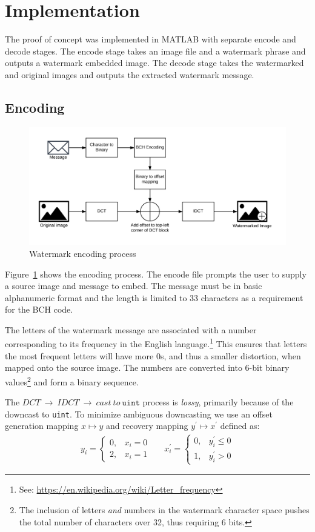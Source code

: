 \section{Implementation}\label{sec:impl}
The proof of concept was implemented in MATLAB with separate encode and decode stages.
The encode stage takes an image file and a watermark phrase and outputs a watermark embedded image.
The decode stage takes the watermarked and original images and outputs the extracted watermark message.

\subsection{Encoding}
\begin{figure}[tbph]
  \centering
  \includegraphics[width=0.75\linewidth]{graphics/encode}
  \caption{Watermark encoding process}
  \label{fig:encode}
\end{figure}

Figure~\ref{fig:encode} shows the encoding process.
The encode file prompts the user to supply a source image and message to embed.
The message must be in basic alphanumeric format and the length is limited to 33 characters as a requirement for the BCH code.

The letters of the watermark message are associated with a number corresponding to its frequency in the English language.\footnote{See: \url{https://en.wikipedia.org/wiki/Letter_frequency}}
This ensures that letters the most frequent letters will have more 0s, and thus a smaller distortion, when mapped onto the source image.
The numbers are converted into 6-bit binary values\footnote{The inclusion of letters \textit{and} numbers in the watermark character space pushes the total number of characters over 32, thus requiring 6 bits.} and form a binary sequence.

The $DCT~\rightarrow~IDCT~\rightarrow~cast~to~\texttt{uint}$ process is \textit{lossy}, primarily because of the downcast to \texttt{uint}.
To minimize ambiguous downcasting we use an offset generation mapping $x \mapsto y$ and recovery mapping $ y^{\prime} \mapsto x^{\prime}$ defined as:
\begin{align*}
y_i = \begin{cases}
0, & x_i = 0\\
2, & x_i = 1
\end{cases}
&&
x^{\prime}_i = \begin{cases}
0, & y^{\prime}_i \le 0 \\
1, & y^{\prime}_i > 0
\end{cases}
\end{align*}

